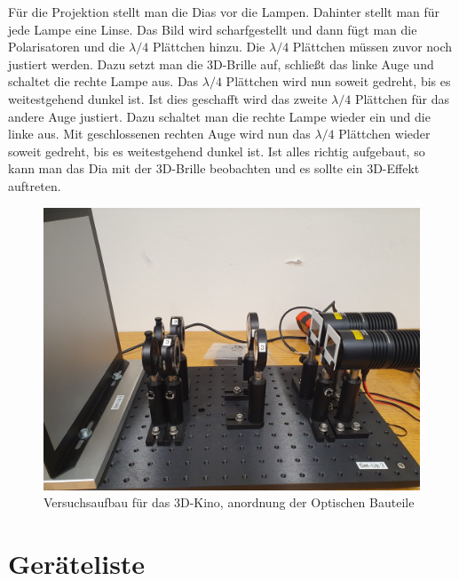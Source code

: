 \documentclass[12pt,a4paper,twoside]{article}
\begin{document}
\noindent
Für die Projektion stellt man die Dias vor die Lampen. Dahinter stellt man für jede Lampe eine Linse. 
Das Bild wird scharfgestellt und dann fügt man die Polarisatoren und die $\lambda/4$ Plättchen hinzu. 
Die $\lambda/4$ Plättchen müssen zuvor noch justiert werden. Dazu setzt man die 3D-Brille auf, schließt das linke Auge und schaltet die rechte Lampe aus. 
Das $\lambda/4$ Plättchen wird nun soweit gedreht, bis es weitestgehend dunkel ist. Ist dies geschafft wird das zweite $\lambda/4$ Plättchen für das andere Auge justiert. 
Dazu schaltet man die rechte Lampe wieder ein und die linke aus. Mit geschlossenen rechten Auge wird nun das $\lambda/4$ Plättchen wieder soweit gedreht, bis es weitestgehend dunkel ist. 
Ist alles richtig aufgebaut, so kann man das Dia mit der 3D-Brille beobachten und es sollte ein 3D-Effekt auftreten. 

\begin{figure}[H]
    \centering
    \includegraphics[width=0.6\linewidth]{nudes/3d kino aufbau hell.jpg}
    \caption{Versuchsaufbau für das 3D-Kino, anordnung der Optischen Bauteile}
    \label{fig:3D Kino aufbau}
\end{figure}

\section{Geräteliste} %
\end{document}
